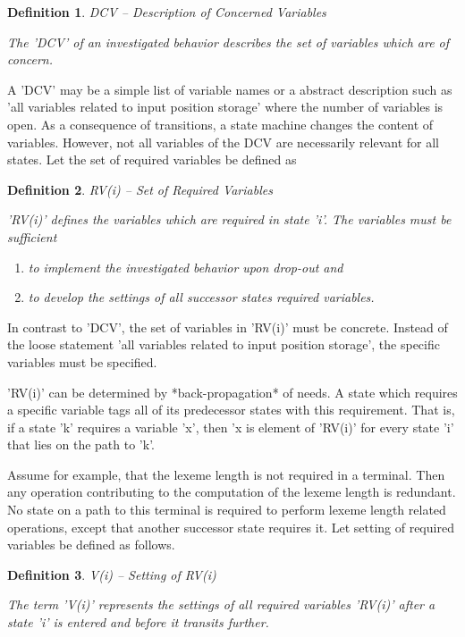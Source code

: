 \documentclass[12pt]{article}
\newtheorem{definition}{Definition}
\begin{document}
\begin{definition}
DCV -- Description of Concerned Variables

The 'DCV' of an investigated behavior describes the set of variables which
are of concern. 
\end{definition}

A 'DCV' may be a simple list of variable names or a abstract description such
as 'all variables related to input position storage' where the number of
variables is open.  As a consequence of transitions, a state machine changes
the content of variables. However, not all variables of the DCV are necessarily
relevant for all states. Let the set of required variables be defined as

\begin{definition}
RV(i) -- Set of Required Variables

'RV(i)' defines the variables which are required in state 'i'. The
variables must be sufficient

\begin{enumerate}
\item  to implement the investigated behavior upon drop-out and
\item to develop the settings of all successor states required variables.
\end{enumerate}
\end{definition}

In contrast to 'DCV', the set of variables in 'RV(i)' must be concrete.
Instead of the loose statement 'all variables related to input position
storage', the specific variables must be specified. 

'RV(i)' can be determined by *back-propagation* of needs. A state which
requires a specific variable tags all of its predecessor states with this
requirement. That is, if a state 'k' requires a variable 'x', then 'x is
element of 'RV(i)' for every state 'i' that lies on the path to 'k'.

Assume for example, that the lexeme length is not required in a terminal. Then
any operation contributing to the computation of the lexeme length is
redundant.  No state on a path to this terminal is required to perform lexeme
length related operations, except that another successor state requires it.
Let setting of required variables be defined as follows.

\begin{definition}
V(i) -- Setting of RV(i)

The term 'V(i)' represents the settings of all required variables 'RV(i)'
after a state 'i' is entered and before it transits further. 
\end{definition}
    
\end{document}
